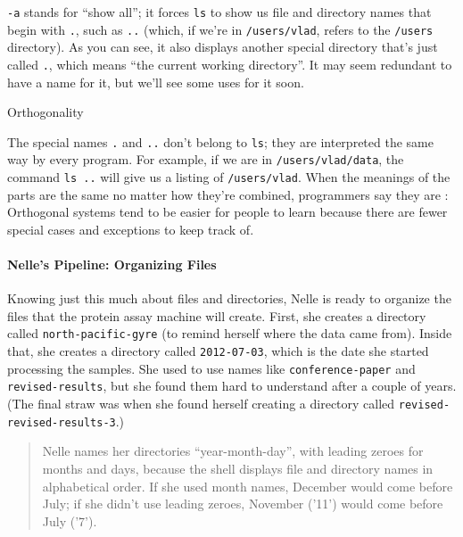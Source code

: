 \documentclass{book}
\begin{document}
\texttt{-a} stands for ``show all''; it forces \texttt{ls} to show us
file and directory names that begin with \texttt{.}, such as \texttt{..}
(which, if we're in \texttt{/users/vlad}, refers to the \texttt{/users}
directory). As you can see, it also displays another special directory
that's just called \texttt{.}, which means ``the current working
directory''. It may seem redundant to have a name for it, but we'll see
some uses for it soon.

\begin{swcbox}{Orthogonality}

The special names \texttt{.} and \texttt{..} don't belong to
\texttt{ls}; they are interpreted the same way by every program. For
example, if we are in \texttt{/users/vlad/data}, the command
\texttt{ls ..} will give us a listing of \texttt{/users/vlad}. When the
meanings of the parts are the same no matter how they're combined,
programmers say they are : Orthogonal
systems tend to be easier for people to learn because there are fewer
special cases and exceptions to keep track of.

\end{swcbox}

\mbox{}\paragraph{Nelle's Pipeline: Organizing Files}

Knowing just this much about files and directories, Nelle is ready to
organize the files that the protein assay machine will create. First,
she creates a directory called \texttt{north-pacific-gyre} (to remind
herself where the data came from). Inside that, she creates a directory
called \texttt{2012-07-03}, which is the date she started processing the
samples. She used to use names like \texttt{conference-paper} and
\texttt{revised-results}, but she found them hard to understand after a
couple of years. (The final straw was when she found herself creating a
directory called \texttt{revised-revised-results-3}.)

\begin{quote}
Nelle names her directories ``year-month-day'', with leading zeroes for
months and days, because the shell displays file and directory names in
alphabetical order. If she used month names, December would come before
July; if she didn't use leading zeroes, November ('11') would come
before July ('7').
\end{quote}
\end{document}
